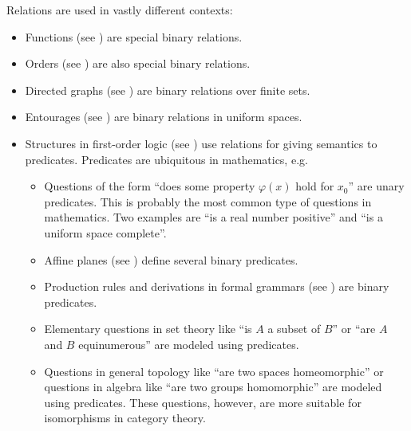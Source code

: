\begin{example}\label{ex:relation}
  Relations are used in vastly different contexts:
  \begin{itemize}
    \item Functions (see ) are special binary relations.
    \item Orders (see ) are also special binary relations.
    \item Directed graphs (see ) are binary relations over finite sets.
    \item Entourages (see ) are binary relations in uniform spaces.
    \item Structures in first-order logic (see ) use relations for giving semantics to predicates. Predicates are ubiquitous in mathematics, e.g.
    \begin{itemize}
      \item Questions of the form \enquote{does some property \( \varphi(x) \) hold for \( x_0 \)} are unary predicates. This is probably the most common type of questions in mathematics. Two examples are \enquote{is a real number positive} and \enquote{is a uniform space complete}.
      \item Affine planes (see ) define several binary predicates.
      \item Production rules and derivations in formal grammars (see ) are binary predicates.
      \item Elementary questions in set theory like \enquote{is \( A \) a subset of \( B \)} or \enquote{are \( A \) and \( B \) equinumerous} are modeled using predicates.
      \item Questions in general topology like \enquote{are two spaces homeomorphic} or questions in algebra like \enquote{are two groups homomorphic} are modeled using predicates. These questions, however, are more suitable for isomorphisms in category theory.
    \end{itemize}
  \end{itemize}
\end{example}

